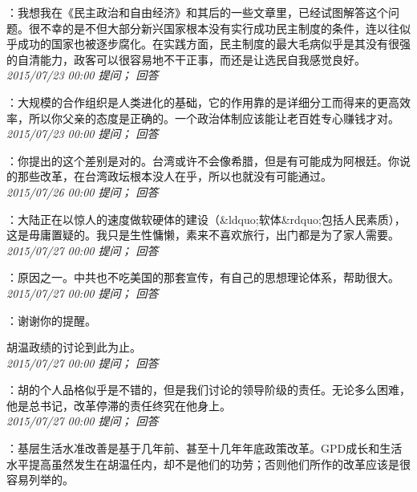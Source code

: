 \documentclass[twocolumn]{ctexart}
\begin{document}
：我想我在《民主政治和自由经济》和其后的一些文章里，已经试图解答这个问题。很不幸的是不但大部分新兴国家根本没有实行成功民主制度的条件，连以往似乎成功的国家也被逐步腐化。在实践方面，民主制度的最大毛病似乎是其没有很强的自清能力，政客可以很容易地不干正事，而还是让选民自我感觉良好。\\

\textit{\hfill\noindent\small 2015/07/23 00:00 提问； 回答}

：大规模的合作组织是人类进化的基础，它的作用靠的是详细分工而得来的更高效率，所以你父亲的态度是正确的。一个政治体制应该能让老百姓专心赚钱才对。\\

\textit{\hfill\noindent\small 2015/07/23 00:00 提问； 回答}

：你提出的这个差别是对的。台湾或许不会像希腊，但是有可能成为阿根廷。你说的那些改革，在台湾政坛根本没人在乎，所以也就没有可能通过。\\

\textit{\hfill\noindent\small 2015/07/26 00:00 提问； 回答}

：大陆正在以惊人的速度做软硬体的建设（\&ldquo;软体\&rdquo;包括人民素质），这是毋庸置疑的。我只是生性慵懒，素来不喜欢旅行，出门都是为了家人需要。\\

\textit{\hfill\noindent\small 2015/07/27 00:00 提问； 回答}

：原因之一。中共也不吃美国的那套宣传，有自己的思想理论体系，帮助很大。\\

\textit{\hfill\noindent\small 2015/07/27 00:00 提问； 回答}

：谢谢你的提醒。

胡温政绩的讨论到此为止。\\

\textit{\hfill\noindent\small 2015/07/27 00:00 提问； 回答}

：胡的个人品格似乎是不错的，但是我们讨论的领导阶级的责任。无论多么困难，他是总书记，改革停滞的责任终究在他身上。\\

\textit{\hfill\noindent\small 2015/07/27 00:00 提问； 回答}

：基层生活水准改善是基于几年前、甚至十几年年底政策改革。GPD成长和生活水平提高虽然发生在胡温任内，却不是他们的功劳；否则他们所作的改革应该是很容易列举的。\\
\end{document}
